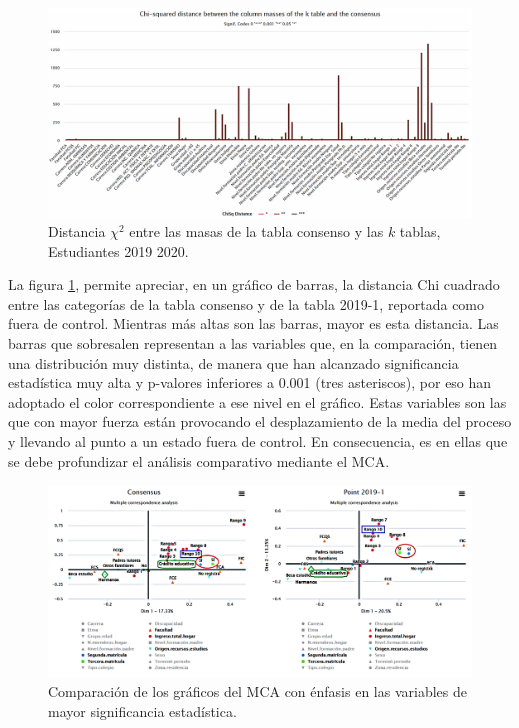 \documentclass[water,article,submit,moreauthors,pdftex]{mdpi}
\begin{document}
\begin{figure}[!ht]



\begin{center}\includegraphics[width=0.9\linewidth,]{chibar2} \end{center}

\caption{Distancia $\chi^2$ entre las masas de la tabla consenso y las $k$ tablas, Estudiantes 2019 2020.}

\label{fig:conspointedu}
\end{figure}

La figura \ref{fig:conspointedu}, permite apreciar, en un gráfico de
barras, la distancia Chi cuadrado entre las categorías de la tabla
consenso y de la tabla 2019-1, reportada como fuera de control. Mientras
más altas son las barras, mayor es esta distancia. Las barras que
sobresalen representan a las variables que, en la comparación, tienen
una distribución muy distinta, de manera que han alcanzado significancia
estadística muy alta y p-valores inferiores a 0.001 (tres asteriscos),
por eso han adoptado el color correspondiente a ese nivel en el gráfico.
Estas variables son las que con mayor fuerza están provocando el
desplazamiento de la media del proceso y llevando al punto a un estado
fuera de control. En consecuencia, es en ellas que se debe profundizar
el análisis comparativo mediante el MCA.

\begin{figure}[!ht]



\begin{center}\includegraphics[width=0.9\linewidth,]{mcacompedu} \end{center}

\caption{Comparación de los gráficos del MCA con énfasis en las variables de mayor significancia estadística.}

\label{fig:mcapointedu}
\end{figure}
\end{document}
